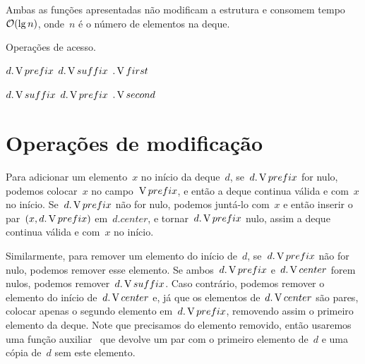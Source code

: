 \documentclass[main.tex]{subfiles}
\begin{document}
Ambas as funções apresentadas não modificam a estrutura e consomem tempo~$\mathcal{O}(\lg n)$, onde~$n$ é o número de elementos na deque.

\begin{algorithm}
\caption{Operações de acesso.} \label{lst:deque_acesso}
\begin{algorithmic}[1]

	\State \Return \Null
\EndFunction

		\State \Return $d.\operatorname{V}{prefix}$
		\State \Return $d.\operatorname{V}{suffix}$
	\Else
		\State \Return {}$.\operatorname{V}{first}$
	\EndIf
\EndFunction

		\State \Return $d.\operatorname{V}{suffix}$
		\State \Return $d.\operatorname{V}{prefix}$
	\Else
		\State \Return {}$.\operatorname{V}{second}$
	\EndIf
\EndFunction



\end{algorithmic}
\end{algorithm}

\section{Operações de modificação}

Para adicionar um elemento~$x$ no início da deque~$d$, se~$d.\operatorname{V}{prefix}$ for nulo, podemos colocar~$x$ no campo~$\operatorname{V}{prefix}$, e então a deque continua válida e com~$x$ no início. Se~$d.\operatorname{V}{prefix}$ não for nulo, podemos juntá-lo com~$x$ e então inserir o par~$(x, d.\operatorname{V}{prefix})$ em~$d.center$, e tornar~$d.\operatorname{V}{prefix}$ nulo, assim a deque continua válida e com~$x$ no início.

Similarmente, para remover um elemento do início de~$d$, se~$d.\operatorname{V}{prefix}$ não for nulo, podemos remover esse elemento. Se ambos~$d.\operatorname{V}{prefix}$ e~$d.\operatorname{V}{center}$ forem nulos, podemos remover~$d.\operatorname{V}{suffix}$. Caso contrário, podemos remover o elemento do início de~$d.\operatorname{V}{center}$ e, já que os elementos de~$d.\operatorname{V}{center}$ são pares, colocar apenas o segundo elemento em~$d.\operatorname{V}{prefix}$, removendo assim o primeiro elemento da deque. Note que precisamos do elemento removido, então usaremos uma função auxiliar~ que devolve um par com o primeiro elemento de~$d$ e uma cópia de~$d$ sem este elemento.
\end{document}
